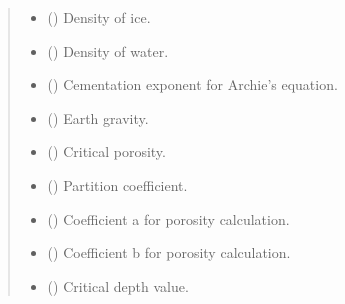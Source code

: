 \documentclass[a4paper,11pt,english,openany]{sphinxmanual}
\begin{document}
\begin{fulllineitems}
\begin{quote}
\begin{description}
\begin{itemize}
\item {} 
\sphinxAtStartPar
{} () \textendash{} Density of ice.

\item {} 
\sphinxAtStartPar
{} () \textendash{} Density of water.

\item {} 
\sphinxAtStartPar
{} () \textendash{} Cementation exponent for Archie’s equation.

\item {} 
\sphinxAtStartPar
{} () \textendash{} Earth gravity.

\item {} 
\sphinxAtStartPar
{} () \textendash{} Critical porosity.

\item {} 
\sphinxAtStartPar
{} () \textendash{} Partition coefficient.

\item {} 
\sphinxAtStartPar
{} () \textendash{} Coefficient a for porosity calculation.

\item {} 
\sphinxAtStartPar
{} () \textendash{} Coefficient b for porosity calculation.

\item {} 
\sphinxAtStartPar
{} () \textendash{} Critical depth value.

\end{itemize}

\end{description}\end{quote}


\end{fulllineitems}
\end{document}
